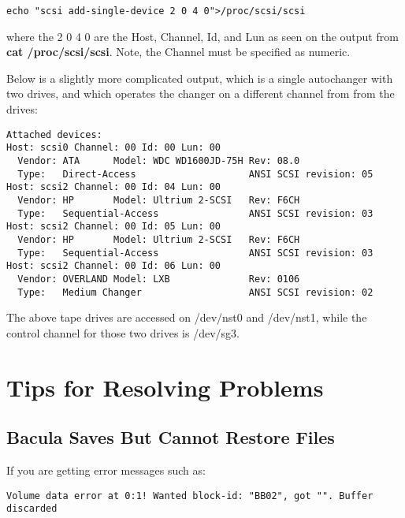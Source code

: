 \footnotesize
\begin{verbatim}
echo "scsi add-single-device 2 0 4 0">/proc/scsi/scsi
\end{verbatim}
\normalsize

where the 2 0 4 0 are the Host, Channel, Id, and Lun as seen on the output
from {\bf cat /proc/scsi/scsi}. Note, the Channel must be specified as
numeric. 

Below is a slightly more complicated output, which is a single autochanger
with two drives, and which operates the changer on a different channel
from from the drives:

\footnotesize
\begin{verbatim}
Attached devices:
Host: scsi0 Channel: 00 Id: 00 Lun: 00
  Vendor: ATA      Model: WDC WD1600JD-75H Rev: 08.0
  Type:   Direct-Access                    ANSI SCSI revision: 05
Host: scsi2 Channel: 00 Id: 04 Lun: 00
  Vendor: HP       Model: Ultrium 2-SCSI   Rev: F6CH
  Type:   Sequential-Access                ANSI SCSI revision: 03
Host: scsi2 Channel: 00 Id: 05 Lun: 00
  Vendor: HP       Model: Ultrium 2-SCSI   Rev: F6CH
  Type:   Sequential-Access                ANSI SCSI revision: 03
Host: scsi2 Channel: 00 Id: 06 Lun: 00
  Vendor: OVERLAND Model: LXB              Rev: 0106
  Type:   Medium Changer                   ANSI SCSI revision: 02
\end{verbatim}
\normalsize

The above tape drives are accessed on /dev/nst0 and /dev/nst1, while
the control channel for those two drives is /dev/sg3.



\label{problems1}
\section{Tips for Resolving Problems}

\label{CannotRestore}
\subsection{Bacula Saves But Cannot Restore Files}

If you are getting error messages such as: 

\footnotesize
\begin{verbatim}
Volume data error at 0:1! Wanted block-id: "BB02", got "". Buffer discarded
\end{verbatim}
\normalsize


